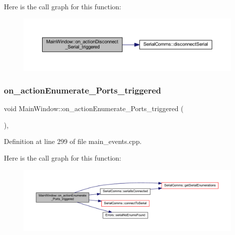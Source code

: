 Here is the call graph for this function\+:
\nopagebreak
\begin{figure}[H]
\begin{center}
\leavevmode
\includegraphics[width=350pt]{class_main_window_adac02082b520624b82e63d66eb2f1f57_cgraph}
\end{center}
\end{figure}
\mbox{\label{class_main_window_a46438ceaa867139cda643f2704fc7f55}} 
\subsubsection{\texorpdfstring{on\_actionEnumerate\_Ports\_triggered}{on\_actionEnumerate\_Ports\_triggered}}
{\footnotesize\ttfamily void Main\+Window\+::on\+\_\+action\+Enumerate\+\_\+\+Ports\+\_\+triggered (\begin{DoxyParamCaption}{ }\end{DoxyParamCaption})\hspace{0.3cm}{\ttfamily [private]}, {\ttfamily [slot]}}



Definition at line 299 of file main\+\_\+events.\+cpp.

Here is the call graph for this function\+:
\nopagebreak
\begin{figure}[H]
\begin{center}
\leavevmode
\includegraphics[width=350pt]{class_main_window_a46438ceaa867139cda643f2704fc7f55_cgraph}
\end{center}
\end{figure}
\mbox{\label{class_main_window_ad210784d93519aa0e1664b943142ad97}} 
